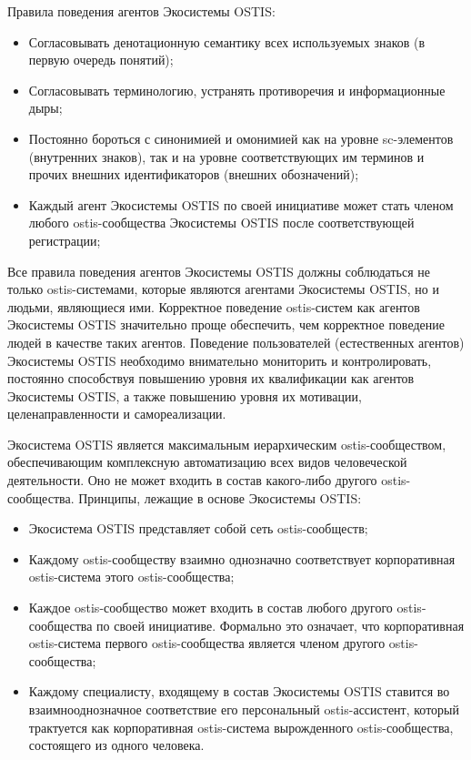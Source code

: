 Правила поведения агентов Экосистемы OSTIS:
\begin{itemize}
    \item Согласовывать денотационную семантику всех используемых знаков (в первую очередь понятий);
    \item Согласовывать терминологию, устранять противоречия и информационные дыры;
    \item Постоянно бороться с синонимией и омонимией как на уровне sc-элементов (внутренних знаков), так и на уровне соответствующих им терминов и прочих внешних идентификаторов (внешних обозначений);
    \item Каждый агент Экосистемы OSTIS по своей инициативе может стать членом любого ostis-сообщества Экосистемы OSTIS после соответствующей регистрации;
\end{itemize}

Все правила поведения агентов Экосистемы OSTIS должны соблюдаться не только ostis-системами, которые являются агентами Экосистемы OSTIS, но и людьми, являющиеся ими. 
Корректное поведение ostis-систем как агентов Экосистемы OSTIS значительно проще обеспечить, чем корректное поведение людей в качестве таких агентов. 
Поведение пользователей (естественных агентов) Экосистемы OSTIS необходимо внимательно мониторить и контролировать, постоянно способствуя повышению уровня их квалификации как агентов Экосистемы OSTIS, а также повышению уровня их мотивации, целенаправленности и самореализации.

Экосистема OSTIS является максимальным иерархическим ostis-сообществом, обеспечивающим комплексную автоматизацию всех видов человеческой деятельности. 
Оно не может входить в состав какого-либо другого ostis-сообщества. 
Принципы, лежащие в основе Экосистемы OSTIS:
\begin{itemize}
    \item Экосистема OSTIS представляет собой сеть ostis-сообществ;
    \item Каждому ostis-сообществу взаимно однозначно соответствует корпоративная ostis-система этого ostis-сообщества;
    \item Каждое ostis-сообщество может входить в состав любого другого ostis-сообщества по своей инициативе. Формально это означает, что корпоративная ostis-система первого ostis-сообщества является членом другого ostis-сообщества;
    \item Каждому специалисту, входящему в состав Экосистемы OSTIS ставится во взаимнооднозначное соответствие его персональный ostis-ассистент, который трактуется как корпоративная ostis-система вырожденного ostis-сообщества, состоящего из одного человека.
\end{itemize}

